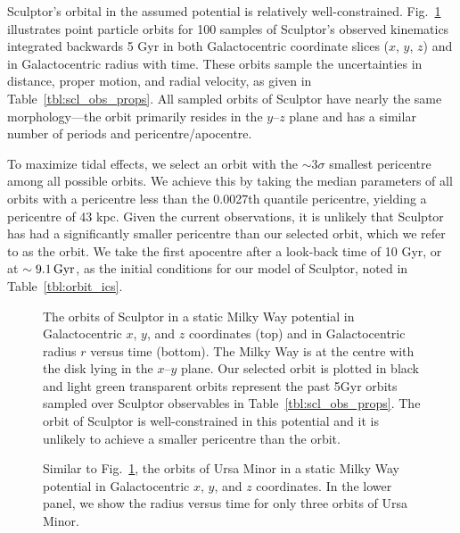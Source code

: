 Sculptor's orbital in the assumed potential is relatively
well-constrained. Fig.~\ref{fig:scl_orbits} illustrates point particle
orbits for 100 samples of Sculptor's observed kinematics integrated
backwards 5 Gyr in both Galactocentric coordinate slices (\(x\), \(y\),
\(z\)) and in Galactocentric radius with time. These orbits sample the
uncertainties in distance, proper motion, and radial velocity, as given
in Table~\ref{tbl:scl_obs_props}. All sampled orbits of Sculptor have
nearly the same morphology---the orbit primarily resides in the
\(y\)--\(z\) plane and has a similar number of periods and
pericentre/apocentre.

To maximize tidal effects, we select an orbit with the \(\sim 3\sigma\)
smallest pericentre among all possible orbits. We achieve this by taking
the median parameters of all orbits with a pericentre less than the
0.0027th quantile pericentre, yielding a pericentre of 43 kpc. Given the
current observations, it is unlikely that Sculptor has had a
significantly smaller pericentre than our selected orbit, which we refer
to as the \smallperi{} orbit. We take the first apocentre after a
look-back time of 10 Gyr, or at \(\sim9.1\,{\rm Gyr}\), as the initial
conditions for our model of Sculptor, noted in
Table~\ref{tbl:orbit_ics}.

\begin{figure}
\centering
{}
\caption[Sculptor's possible orbits]{The orbits of Sculptor in a static
Milky Way potential in Galactocentric \(x\), \(y\), and \(z\)
coordinates (top) and in Galactocentric radius \(r\) versus time
(bottom). The Milky Way is at the centre with the disk lying in the
\(x\)--\(y\) plane. Our selected \smallperi{} orbit is plotted in black
and light green transparent orbits represent the past 5Gyr orbits
sampled over Sculptor observables in Table~\ref{tbl:scl_obs_props}. The
orbit of Sculptor is well-constrained in this potential and it is
unlikely to achieve a smaller pericentre than the \smallperi{}
orbit.}\label{fig:scl_orbits}
\end{figure}

\begin{figure}
\centering
{}
\caption[Ursa Minor's possible orbits]{Similar to
Fig.~\ref{fig:scl_orbits}, the orbits of Ursa Minor in a static Milky
Way potential in Galactocentric \(x\), \(y\), and \(z\) coordinates. In
the lower panel, we show the radius versus time for only three orbits of
Ursa Minor.}\label{fig:umi_orbits}
\end{figure}

